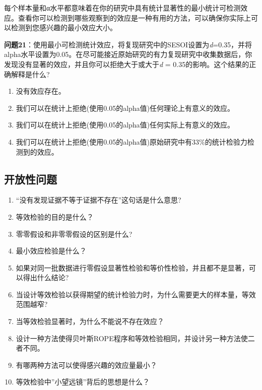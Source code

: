 \documentclass[
  letterpaper,
  DIV=11,
  numbers=noendperiod]{scrreprt}
\providecommand{\tightlist}{%
  \setlength{\itemsep}{0pt}\setlength{\parskip}{0pt}}\usepackage{longtable,booktabs,array}
\begin{document}
每个样本量和α水平都意味着在你的研究中具有统计显著性的最小统计可检测效应。查看你可以检测到哪些观察到的效应是一种有用的方法，可以确保你实际上可以检测到您感兴趣的最小效应大小。

\textbf{问题21}：使用最小可检测统计效应，将复现研究中的SESOI设置为\emph{d}=0.35，并将alpha水平设置为0.05。在尽可能接近原始研究的有力复现研究中收集数据后，你发现没有显著的效应，并且你可以拒绝大于或大于\emph{d}
= 0.35的影响。这个结果的正确解释是什么?

\begin{enumerate}
\def\labelenumi{\Alph{enumi})}
\tightlist
\item
  没有效应存在。
\item
  我们可以在统计上拒绝(使用0.05的alpha值)任何理论上有意义的效应。
\item
  我们可以在统计上拒绝(使用0.05的alpha值)任何实际上有意义的效应。
\item
  我们可以在统计上拒绝(使用0.05的alpha值)原始研究中有33\%的统计检验力检测到的效应。
\end{enumerate}

\hypertarget{ux5f00ux653eux6027ux95eeux9898-1}{%
\subsection{开放性问题}\label{ux5f00ux653eux6027ux95eeux9898-1}}

\begin{enumerate}
\def\labelenumi{\arabic{enumi}.}
\item
  ``没有发现证据不等于证据不存在''这句话是什么意思?
\item
  等效检验的目的是什么？
\item
  零零假设和非零零假设的区别是什么?
\item
  最小效应检验是什么？
\item
  如果对同一批数据进行零假设显著性检验和等价性检验，并且都不是显著，可以得出什么结论?
\item
  当设计等效检验以获得期望的统计检验力时，为什么需要更大的样本量，等效范围越窄?
\item
  当等效检验显著时，为什么不能说不存在效应？
\item
  设计一种方法使得贝叶斯ROPE程序和等效检验相同，并设计另一种方法使二者不同。
\item
  有哪两种方法可以使得感兴趣的效应量最小？
\item
  等效检验中''小望远镜''背后的思想是什么？
\end{enumerate}

\end{document}
